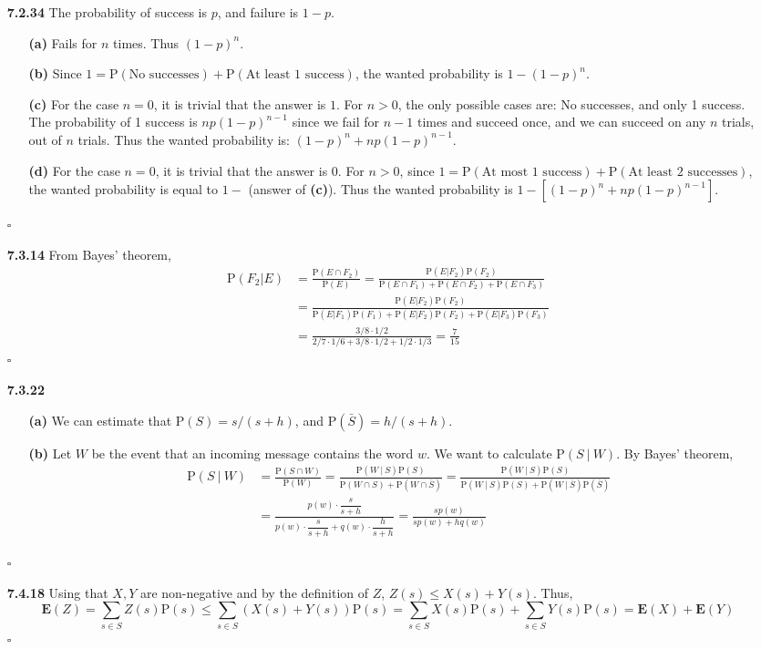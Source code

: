 \documentclass{article}
\newcommand*{\qed}{\hfill\ensuremath{\square}}%
\newcommand*{\pr}{\mathrm{P}}%
\newcommand*{\ex}{\mathrm{\mathbf{E}}}%
\begin{document}
\begin{itemize}
\item[\large \textbf{7.2.34}] The probability of success is $p$, and failure is $1-p$.
	\begin{itemize}
		\item[\textbf{(a)}] Fails for $n$ times. Thus $(1-p)^n$.
		\item[\textbf{(b)}] Since $1 = \pr(\text{No successes}) + \pr(\text{At least 1 success})$, the wanted probability is $1-(1-p)^n$.
		\item[\textbf{(c)}] For the case $n = 0$, it is trivial that the answer is $1$. For $n> 0$, the only possible cases are: No successes, and only 1 success. The probability of 1 success is $np(1-p)^{n-1}$ since we fail for $n-1$ times and succeed once, and we can succeed on any $n$ trials, out of $n$ trials. Thus the wanted probability is: $(1-p)^n + np(1-p)^{n-1}$. 
		\item[\textbf{(d)}] For the case $n = 0$, it is trivial that the answer is $0$. For $n> 0$, since $1 = \pr(\text{At most 1 success}) + \pr(\text{At least 2 successes})$, the wanted probability is equal to $1 -$ (answer of \textbf{(c)}). Thus the wanted probability is $1-\left[(1-p)^n + np(1-p)^{n-1}\right]$.
	\end{itemize} \qed
\item[\large \textbf{7.3.14}] From Bayes' theorem,
$$
\begin{aligned}
	\pr(F_2 | E) &= \frac{\pr(E\cap F_2)}{\pr(E)} = \frac{\pr(E | F_2)\pr(F_2)}{\pr(E \cap F_1) + \pr(E \cap F_2) + \pr(E \cap F_3)} \\
	 &= \frac{\pr(E | F_2)\pr(F_2)}{\pr(E | F_1)\pr(F_1) + \pr(E | F_2)\pr(F_2) + \pr(E | F_3)\pr(F_3)} \\
	 &= \frac{{3}/{8}\cdot {1}/{2}}{{2}/{7}\cdot{1}/{6} + {3}/{8}\cdot{1}/{2} + {1}/{2}\cdot{1}/{3}} = \frac{7}{15}
\end{aligned}
$$\qed

\item[\large \textbf{7.3.22}] 
	\begin{itemize}
		\item[\textbf{(a)}] We can estimate that $\pr(S) = s/(s+h)$, and $\pr(\bar{S}) = h/(s+h)$.
		\item[\textbf{(b)}] Let $W$ be the event that an incoming message contains the word $w$. We want to calculate $\pr(S \: |\:W)$. By Bayes' theorem,
		$$
		\begin{aligned}
		\pr(S \: |\:W) &= \frac{\pr(S \cap W)}{\pr(W)} = \frac{\pr(W \: | \:S)\pr(S)}{\pr(W\cap S) + \pr(W\cap \bar{S})} = \frac{\pr(W \: | \:S)\pr(S)}{\pr(W \: | \:S)\pr(S) + \pr(W \: | \:\bar{S})\pr(\bar{S})}\\
		&=\frac{p(w)\cdot \dfrac{s}{s+h}}{p(w) \cdot\dfrac{s}{s+h} + q(w) \cdot\dfrac{h}{s+h}} = \frac{sp(w)}{sp(w) + hq(w)}
		\end{aligned}
		$$
	\end{itemize} \qed
\item[\large \textbf{7.4.18}] Using that $X, Y$ are non-negative and by the definition of $Z$, $Z(s) \leq X(s)+Y(s)$. Thus,
$$\ex(Z) = \sum_{s\in S} Z(s) \pr(s) \leq \sum_{s \in S} (X(s)+Y(s))\pr(s) = \sum_{s \in S} X(s)\pr(s) + \sum_{s \in S} Y(s)\pr(s) = \ex(X)+\ex(Y)$$ \qed


\end{itemize}
\end{document}
